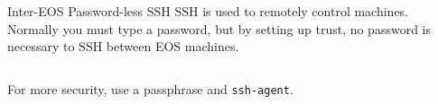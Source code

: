 \begin{block}{Inter-EOS Password-less SSH}
  SSH is used to remotely control machines. Normally you must type a password, but by setting up trust, no password is necessary to SSH between EOS machines.
  {\scriptsize \inputminted[tabsize=2,frame=single]{bash}{scripts/ssh.bash}}
  For more security, use a passphrase and \texttt{ssh-agent}.
\end{block}
